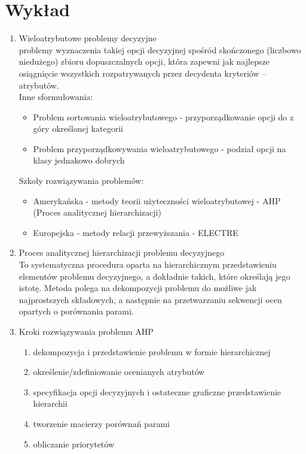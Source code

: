 \documentclass[11pt]{article}
\begin{document}
    \section{Wykład}
    \begin{enumerate}
        \item Wieloatrybutowe problemy decyzyjne \\
        problemy wyznaczenia takiej opcji decyzyjnej
        spośród skończonego (liczbowo niedużego) zbioru dopuszczalnych opcji,
        która zapewni jak najlepsze osiągnięcie wszystkich rozpatrywanych przez
        decydenta kryteriów – atrybutów.\\
        Inne sformułowania:
        \begin{itemize}
        	\item Problem sortowania wieloatrybutowego - przyporządkowanie opcji
        	do z góry określonej kategorii
        	\item Problem przyporządkowywania wieloatrybutowego - podział opcji na
        	klasy jednakowo dobrych
        \end{itemize}
        Szkoły rozwiązywania problemów:
        \begin{itemize}
        	\item Amerykańska - metody teorii użyteczności wieloatrybutowej - AHP
        	 (Proces analitycznej hierarchizacji)
        	 \item Europejska - metody relacji przewyższania - ELECTRE
        \end{itemize}
        
        \item Proces analitycznej hierarchizacji problemu decyzyjnego \\
        To systematyczna procedura oparta na hierarchicznym przedstawieniu
        elementów problemu decyzyjnego, a dokładnie takich, które określają
        jego istotę. Metoda polega na dekompozycji problemu do możliwe jak najprostszych
        składowych, a następnie na przetwarzaniu sekwencji ocen opartych 
        o porównania parami.
        
        \clearpage
        \item Kroki rozwiązywania problemu AHP
        \begin{enumerate}
        	\item dekompozycja i przedstawienie problemu w formie hierarchicznej
        	\item określenie/zdefiniowanie ocenianych atrybutów
        	\item specyfikacja opcji decyzyjnych i ostateczne
        	graficzne przedstawienie hierarchii
        	\item tworzenie macierzy porównań parami
        	\item obliczanie priorytetów
        \end{enumerate}
        

\end{enumerate}
\end{document}
